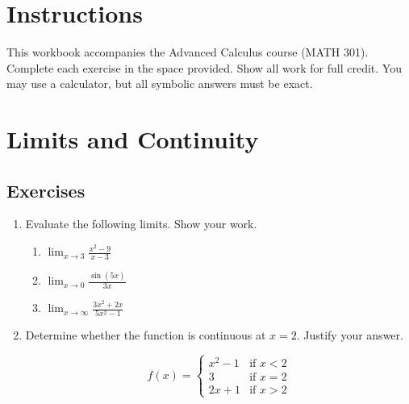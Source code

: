 \documentclass[
    language=english,
    doctype=workbook,
    institution=none,
]{../../omnilatex}
\begin{document}
\maketitle

\section*{Instructions}

This workbook accompanies the Advanced Calculus course (MATH 301). Complete
each exercise in the space provided. Show all work for full credit. You may
use a calculator, but all symbolic answers must be exact.

\section{Limits and Continuity}

\subsection{Exercises}

\begin{enumerate}[label=\textbf{1.\arabic*}]

    \item Evaluate the following limits. Show your work.

    \begin{enumerate}[label=(\alph*)]
        \item $\displaystyle\lim_{x \to 3} \frac{x^{2}-9}{x-3}$
        \vspace{2cm}

        \item $\displaystyle\lim_{x \to 0} \frac{\sin(5x)}{3x}$
        \vspace{2cm}

        \item $\displaystyle\lim_{x \to \infty} \frac{3x^{2}+2x}{5x^{2}-1}$
        \vspace{2cm}
    \end{enumerate}

    \item Determine whether the function is continuous at $x=2$. Justify
          your answer.

    \[
        f(x) = \begin{cases}
            x^{2}-1 & \text{if } x < 2 \\
            3       & \text{if } x = 2 \\
            2x+1    & \text{if } x > 2
        \end{cases}
    \]
    \vspace{3cm}

\end{enumerate}
\end{document}
